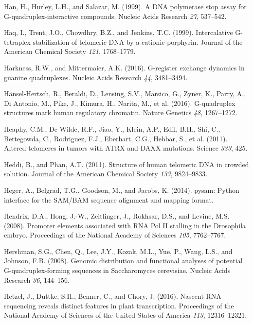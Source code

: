 \documentclass[12pt,a4paper,]{report}
\begin{document}
\leavevmode\hypertarget{ref-Han1999}{}%
Han, H., Hurley, L.H., and Salazar, M. (1999). A DNA polymerase stop
assay for G-quadruplex-interactive compounds. Nucleic Acids Research
\emph{27}, 537--542.

\leavevmode\hypertarget{ref-Haq1999}{}%
Haq, I., Trent, J.O., Chowdhry, B.Z., and Jenkins, T.C. (1999).
Intercalative G-tetraplex stabilization of telomeric DNA by a cationic
porphyrin. Journal of the American Chemical Society \emph{121},
1768--1779.

\leavevmode\hypertarget{ref-Harkness2016}{}%
Harkness, R.W., and Mittermaier, A.K. (2016). G-register exchange
dynamics in guanine quadruplexes. Nucleic Acids Research \emph{44},
3481--3494.

\leavevmode\hypertarget{ref-Hansel2016}{}%
Hänsel-Hertsch, R., Beraldi, D., Lensing, S.V., Marsico, G., Zyner, K.,
Parry, A., Di Antonio, M., Pike, J., Kimura, H., Narita, M., et al.
(2016). G-quadruplex structures mark human regulatory chromatin. Nature
Genetics \emph{48}, 1267--1272.

\leavevmode\hypertarget{ref-Heaphy2011}{}%
Heaphy, C.M., De Wilde, R.F., Jiao, Y., Klein, A.P., Edil, B.H., Shi,
C., Bettegowda, C., Rodriguez, F.J., Eberhart, C.G., Hebbar, S., et al.
(2011). Altered telomeres in tumors with ATRX and DAXX mutations.
Science \emph{333}, 425.

\leavevmode\hypertarget{ref-Heddi2011}{}%
Heddi, B., and Phan, A.T. (2011). Structure of human telomeric DNA in
crowded solution. Journal of the American Chemical Society \emph{133},
9824--9833.

\leavevmode\hypertarget{ref-Heger2014}{}%
Heger, A., Belgrad, T.G., Goodson, M., and Jacobs, K. (2014). pysam:
Python interface for the SAM/BAM sequence alignment and mapping format.

\leavevmode\hypertarget{ref-Hendrix2008}{}%
Hendrix, D.A., Hong, J.-W., Zeitlinger, J., Rokhsar, D.S., and Levine,
M.S. (2008). Promoter elements associated with RNA Pol II stalling in
the Drosophila embryo. Proceedings of the National Academy of Sciences
\emph{105}, 7762--7767.

\leavevmode\hypertarget{ref-Hershman2008}{}%
Hershman, S.G., Chen, Q., Lee, J.Y., Kozak, M.L., Yue, P., Wang, L.S.,
and Johnson, F.B. (2008). Genomic distribution and functional analyses
of potential G-quadruplex-forming sequences in Saccharomyces cerevisiae.
Nucleic Acids Research \emph{36}, 144--156.

\leavevmode\hypertarget{ref-Hetzel2016}{}%
Hetzel, J., Duttke, S.H., Benner, C., and Chory, J. (2016). Nascent RNA
sequencing reveals distinct features in plant transcription. Proceedings
of the National Academy of Sciences of the United States of America
\emph{113}, 12316--12321.
\end{document}
